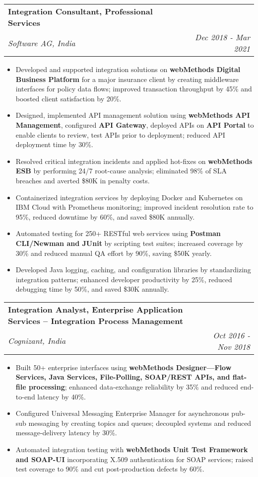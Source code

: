 \documentclass[letterpaper,11pt]{article}
\makeatletter
\newcommand{\resumeItem}[1]{
  \item\small{
    {#1 \vspace{-1pt}}
  }
}
\newcommand{\resumeSubheading}[4]{
  \vspace{-2pt}\item
    \begin{tabular*}{1.0\textwidth}[t]{l@{\extracolsep{\fill}}r}
      \textbf{\large#1} & \textbf{\small #2} \\
      \textit{\large#3} & \textit{\small #4} \\
      
    \end{tabular*}\vspace{-7pt}
}
\newcommand{\resumeItemListStart}{\begin{itemize}[leftmargin=0.1in]}
\newcommand{\resumeItemListEnd}{\end{itemize}\vspace{-5pt}}
\makeatother
\begin{document}
    \resumeSubheading
      {Integration Consultant, Professional Services}{} 
      {Software AG, India}{Dec 2018 - Mar 2021}
      \resumeItemListStart
            \resumeItem{\normalsize{Developed and supported integration solutions on \textbf{webMethods Digital Business Platform} for a major insurance client by creating middleware interfaces for policy data flows; improved transaction throughput by 45\% and boosted client satisfaction by 20\%.}}
            \resumeItem{\normalsize{Designed, implemented API management solution using \textbf{webMethods API Management}, configured \textbf{API Gateway}, deployed APIs on \textbf{API Portal} to enable clients to review, test APIs prior to deployment; reduced API deployment time by 30\%.}}  
            \resumeItem{\normalsize{Resolved critical integration incidents and applied hot-fixes on \textbf{webMethods ESB} by performing 24/7 root-cause analysis; eliminated 98\% of SLA breaches and averted \$80K in penalty costs.}}
            \resumeItem{\normalsize{Containerized integration services by deploying Docker and Kubernetes on IBM Cloud with Prometheus monitoring; improved incident resolution rate to 95\%, reduced downtime by 60\%, and saved \$80K annually.}}  
            \resumeItem{\normalsize{Automated testing for 250+ RESTful web services using \textbf{Postman CLI/Newman and JUnit} by scripting test suites; increased coverage by 30\% and reduced manual QA effort by 90\%, saving \$50K yearly.}}
            \resumeItem{\normalsize{Developed Java logging, caching, and configuration libraries by standardizing integration patterns; enhanced developer productivity by 25\%, reduced debugging time by 50\%, and saved \$30K annually.}}  
      \resumeItemListEnd  

    \resumeSubheading
      {Integration Analyst, Enterprise Application Services -- Integration Process Management}{} 
      {Cognizant, India}{Oct 2016 - Nov 2018}
      \resumeItemListStart
            \resumeItem{\normalsize{Built 50+ enterprise interfaces using \textbf{webMethods Designer---Flow Services, Java Services, File-Polling, SOAP/REST APIs, and flat-file processing}; enhanced data-exchange reliability by 35\% and reduced end-to-end latency by 40\%.}}
            \resumeItem{\normalsize{Configured Universal Messaging Enterprise Manager for asynchronous pub-sub messaging by creating topics and queues; decoupled systems and reduced message-delivery latency by 30\%.}}  
            \resumeItem{\normalsize{Automated integration testing with \textbf{webMethods Unit Test Framework and SOAP-UI} incorporating X.509 authentication for SOAP services; raised test coverage to 90\% and cut post-production defects by 60\%.}}  
      \resumeItemListEnd  
\end{document}
